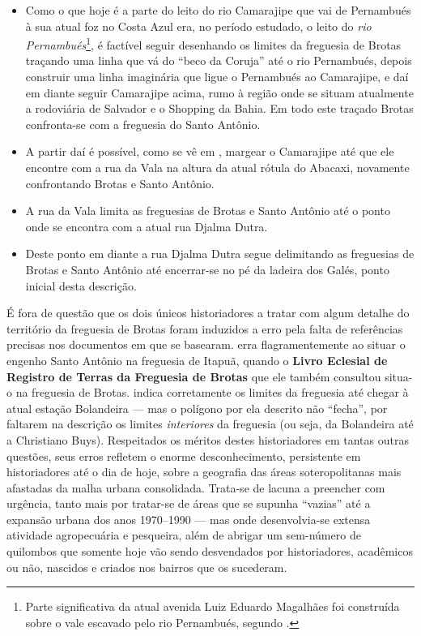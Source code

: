 \begin{itemize}
\item Como o que hoje é a parte do leito do rio Camarajipe que vai de Pernambués à sua atual foz no Costa Azul era, no período estudado, o leito do \textit{rio Pernambués}\footnote{Parte significativa da atual avenida Luiz Eduardo Magalhães foi construída sobre o vale escavado pelo rio Pernambués, segundo \cite{santos_aguas_2010}.}, é factível seguir desenhando os limites da freguesia de Brotas traçando uma linha que vá do ``beco da Coruja'' até o rio Pernambués, depois construir uma linha imaginária que ligue o Pernambués ao Camarajipe, e daí em diante seguir Camarajipe acima, rumo à região onde se situam atualmente a rodoviária de Salvador e o Shopping da Bahia. Em todo este traçado Brotas confronta-se com a freguesia do Santo Antônio.
\item A partir daí é possível, como se vê em , margear o Camarajipe até que ele encontre com a rua da Vala na altura da atual rótula do Abacaxi, novamente confrontando Brotas e Santo Antônio.
\item A rua da Vala limita as freguesias de Brotas e Santo Antônio até o ponto onde se encontra com a atual rua Djalma Dutra.
\item Deste ponto em diante a rua Djalma Dutra segue delimitando as freguesias de Brotas e Santo Antônio até encerrar-se no pé da ladeira dos Galés, ponto inicial desta descrição.
\end{itemize}

É fora de questão que os dois únicos historiadores a tratar com algum detalhe do território da freguesia de Brotas \cite{NASCIMENTO2007,ott_engenhos_1996} foram induzidos a erro pela falta de referências precisas nos documentos em que se basearam.  erra flagramentemente ao situar o engenho Santo Antônio na freguesia de Itapuã, quando o \textbf{Livro Eclesial de Registro de Terras da Freguesia de Brotas} que ele também consultou situa-o na freguesia de Brotas.  indica corretamente os limites da freguesia até chegar à atual estação Bolandeira --- mas o polígono por ela descrito não ``fecha'', por faltarem na descrição os limites \textit{interiores} da freguesia (ou seja, da Bolandeira até a Christiano Buys). Respeitados os méritos destes historiadores em tantas outras questões, seus erros refletem o enorme desconhecimento, persistente em historiadores até o dia de hoje, sobre a geografia das áreas soteropolitanas mais afastadas da malha urbana consolidada. Trata-se de lacuna a preencher com urgência, tanto mais por tratar-se de áreas que se supunha ``vazias'' até a expansão urbana dos anos 1970--1990 --- mas onde desenvolvia-se extensa atividade agropecuária e pesqueira, além de abrigar um sem-número de quilombos que somente hoje vão sendo desvendados por historiadores, acadêmicos ou não, nascidos e criados nos bairros que os sucederam.

